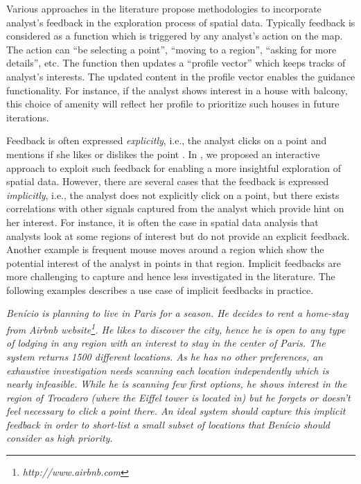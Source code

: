 \documentclass{vldb}
\begin{document}
\vspace{2pt}
Various approaches in the literature propose methodologies to incorporate analyst's feedback in the exploration process of spatial data. Typically feedback is considered as a function which is triggered by any analyst's action on the map. The action can ``be selecting a point'', ``moving to a region'', ``asking for more details'', etc. The function then updates a ``profile vector'' which keeps tracks of analyst's interests. The updated content in the profile vector enables the guidance functionality. For instance, if the analyst shows interest in a house with balcony, this choice of amenity will reflect her profile to prioritize such houses in future iterations.

\vspace{2pt}
Feedback is often expressed {\em explicitly}, i.e., the analyst clicks on a point and mentions if she likes or dislikes the point \cite{kamat2014distributed,Omidvar-Tehrani:2015,omidvar2017geoguide}. In \cite{omidvar2017geoguide}, we proposed an interactive approach to exploit such feedback for enabling a more insightful exploration of spatial data. However, there are several cases that the feedback is expressed {\em implicitly}, i.e., the analyst does not explicitly click on a point, but there exists correlations with other signals captured from the analyst which provide hint on her interest. For instance, it is often the case in spatial data analysis that analysts look at some regions of interest but do not provide an explicit feedback. Another example is frequent mouse moves around a region which show the potential interest of the analyst in points in that region. Implicit feedbacks are more challenging to capture and hence less investigated in the literature. The following examples describes a use case of implicit feedbacks in practice.

\vspace{2pt}
 {\em Ben\'icio is planning to live in Paris for a season. He decides to rent a home-stay from Airbnb website\footnote{\it http://www.airbnb.com}. He likes to discover the city, hence he is open to any type of lodging in any region with an interest to stay in the center of Paris. The system returns 1500 different locations. As he has no other preferences, an exhaustive investigation needs scanning each location independently which is nearly infeasible. While he is scanning few first options, he shows interest in the region of Trocadero (where the Eiffel tower is located in) but he forgets or doesn't feel necessary to click a point there. An ideal system should capture this implicit feedback in order to short-list a small subset of locations that Ben\'icio should consider as high priority}.
\end{document}
